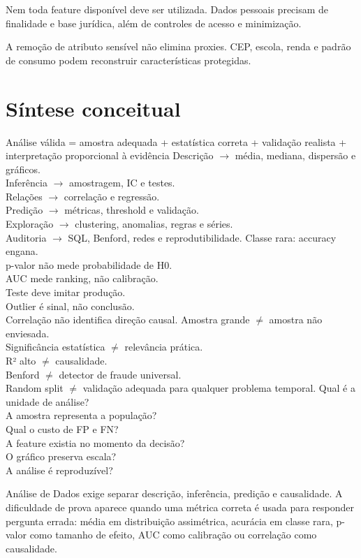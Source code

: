 Nem toda feature disponível deve ser utilizada. Dados pessoais precisam de finalidade e base jurídica, além de controles de acesso e minimização.

A remoção de atributo sensível não elimina proxies. CEP, escola, renda e padrão de consumo podem reconstruir características protegidas.

\section{Síntese conceitual}

{Análise válida = amostra adequada + estatística correta + validação realista + interpretação proporcional à evidência}
{Descrição $\rightarrow$ média, mediana, dispersão e gráficos.\\Inferência $\rightarrow$ amostragem, IC e testes.\\Relações $\rightarrow$ correlação e regressão.\\Predição $\rightarrow$ métricas, threshold e validação.\\Exploração $\rightarrow$ clustering, anomalias, regras e séries.\\Auditoria $\rightarrow$ SQL, Benford, redes e reprodutibilidade.}
{Classe rara: accuracy engana.\\p-valor não mede probabilidade de H0.\\AUC mede ranking, não calibração.\\Teste deve imitar produção.\\Outlier é sinal, não conclusão.\\Correlação não identifica direção causal.}
{Amostra grande $\neq$ amostra não enviesada.\\Significância estatística $\neq$ relevância prática.\\R² alto $\neq$ causalidade.\\Benford $\neq$ detector de fraude universal.\\Random split $\neq$ validação adequada para qualquer problema temporal.}
{Qual é a unidade de análise?\\A amostra representa a população?\\Qual o custo de FP e FN?\\A feature existia no momento da decisão?\\O gráfico preserva escala?\\A análise é reproduzível?}

\begin{resumo}
Análise de Dados exige separar descrição, inferência, predição e causalidade. A dificuldade de prova aparece quando uma métrica correta é usada para responder pergunta errada: média em distribuição assimétrica, acurácia em classe rara, p-valor como tamanho de efeito, AUC como calibração ou correlação como causalidade.
\end{resumo}
